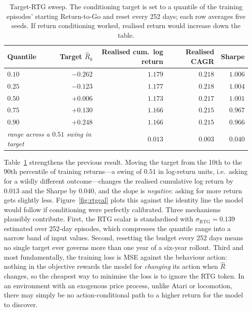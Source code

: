 \documentclass[11pt]{article}
\begin{document}
\begin{table}[h]
\centering
\caption{Target-RTG sweep. The conditioning target is set to a quantile of the training
episodes' starting Return-to-Go and reset every 252 days; each row averages five seeds. If
return conditioning worked, realised return would increase down the table.}
\label{tab:rtg-sweep}
\small
\begin{tabular}{lrrrr}
\toprule
Quantile & Target $\hat{R}_0$ & Realised cum.\ log return & Realised CAGR & Sharpe \\
\midrule
$0.10$ & $-0.262$ & $1.179$ & $0.218$ & $\mathbf{1.006}$ \\
$0.25$ & $-0.123$ & $1.177$ & $0.218$ & $1.004$ \\
$0.50$ & $+0.006$ & $1.173$ & $0.217$ & $1.001$ \\
$0.75$ & $+0.130$ & $1.166$ & $0.215$ & $0.967$ \\
$0.90$ & $+0.248$ & $1.166$ & $0.215$ & $0.966$ \\
\midrule
\multicolumn{2}{l}{\emph{range across a $0.51$ swing in target}} & $0.013$ & $0.003$ & $0.040$ \\
\bottomrule
\end{tabular}
\end{table}

Table~\ref{tab:rtg-sweep} strengthens the previous result. Moving the target from the 10th to
the 90th percentile of training returns---a swing of $0.51$ in log-return units, i.e.\ asking
for a wildly different outcome---changes the realised cumulative log return by $0.013$ and the
Sharpe by $0.040$, and the slope is \emph{negative}: asking for more return gets slightly less.
Figure~\ref{fig:rtgcal} plots this against the identity line the model would follow if
conditioning were perfectly calibrated. Three mechanisms plausibly contribute. First, the RTG
scalar is standardised with $\sigma_{\text{RTG}} = 0.139$ estimated over 252-day episodes,
which compresses the quantile range into a narrow band of input values. Second, resetting the
budget every 252 days means no single target ever governs more than one year of a six-year
rollout. Third and most fundamentally, the training loss is MSE against the behaviour action:
nothing in the objective rewards the model for \emph{changing} its action when $\hat{R}$
changes, so the cheapest way to minimise the loss is to ignore the RTG token. In an environment
with an exogenous price process, unlike Atari or locomotion, there may simply be no
action-conditional path to a higher return for the model to discover.
\end{document}
